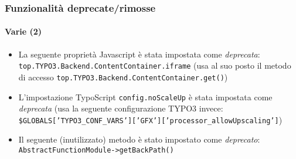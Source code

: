 \begin{frame}[fragile]
	\frametitle{Funzionalità deprecate/rimosse}
	\framesubtitle{Varie (2)}


	\begin{itemize}

		\item La seguente proprietà Javascript è stata impostata come \textit{deprecata}:\newline
			\texttt{top.TYPO3.Backend.ContentContainer.iframe}\newline
			\smaller
				(usa al suo posto il metodo di accesso \texttt{top.TYPO3.Backend.ContentContainer.get()})
			\normalsize

		\item L'impostazione TypoScript \texttt{config.noScaleUp} è stata impostata come \textit{deprecata}\newline
			\smaller
				(usa la seguente configurazione TYPO3 invece:\newline
				\texttt{\$GLOBALS['TYPO3\_CONF\_VARS']['GFX']['processor\_allowUpscaling']})
			\normalsize

		\item Il seguente (inutilizzato) metodo è stato impostato come \textit{deprecato}:\newline
			\texttt{AbstractFunctionModule->getBackPath()}

	\end{itemize}

\end{frame}






